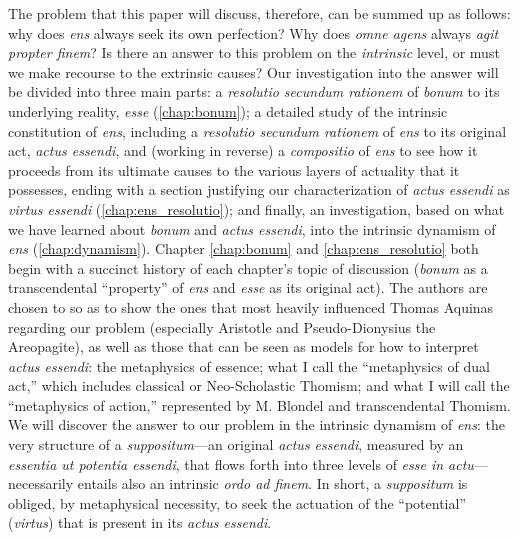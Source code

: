 The problem that this paper will discuss, therefore, can be summed up as follows: why does \emph{ens} always seek its own perfection? Why does \emph{omne agens} always \emph{agit propter finem}? Is there an answer to this problem on the \emph{intrinsic} level, or must we make recourse to the extrinsic causes? Our investigation into the answer will be divided into three main parts: a \emph{resolutio secundum rationem} of \emph{bonum} to its underlying reality, \emph{esse} (\autoref{chap:bonum}); a detailed study of the intrinsic constitution of \emph{ens}, including a \emph{resolutio secundum rationem} of \emph{ens} to its original act, \emph{actus essendi}, and (working in reverse) a \emph{compositio} of \emph{ens} to see how it proceeds from its ultimate causes to the various layers of actuality that it possesses, ending with a section justifying our characterization of \emph{actus essendi} as \emph{virtus essendi} (\autoref{chap:ens_resolutio}); and finally, an investigation, based on what we have learned about \emph{bonum} and \emph{actus essendi}, into the intrinsic dynamism of \emph{ens} (\autoref{chap:dynamism}). Chapter \ref{chap:bonum} and \autoref{chap:ens_resolutio} both begin with a succinct history of each chapter’s topic of discussion (\emph{bonum} as a transcendental “property” of \emph{ens} and \emph{esse} as its original act). The authors are chosen to so as to show the ones that most heavily influenced Thomas Aquinas regarding our problem (especially Aristotle and Pseudo-Dionysius the Areopagite), as well as those that can be seen as models for how to interpret \emph{actus essendi}: the metaphysics of essence; what I call the “metaphysics of dual act,” which includes classical or Neo-Scholastic Thomism; and what I will call the “metaphysics of action,” represented by M. Blondel and transcendental Thomism. We will discover the answer to our problem in the intrinsic dynamism of \emph{ens}: the very structure of a \emph{suppositum}—an original \emph{actus essendi}, measured by an \emph{essentia ut potentia essendi}, that flows forth into three levels of \emph{esse in actu}—necessarily entails also an intrinsic \emph{ordo ad finem}. In short, a \emph{suppositum} is obliged, by metaphysical necessity, to seek the actuation of the “potential” (\emph{virtus}) that is present in its \emph{actus essendi}.